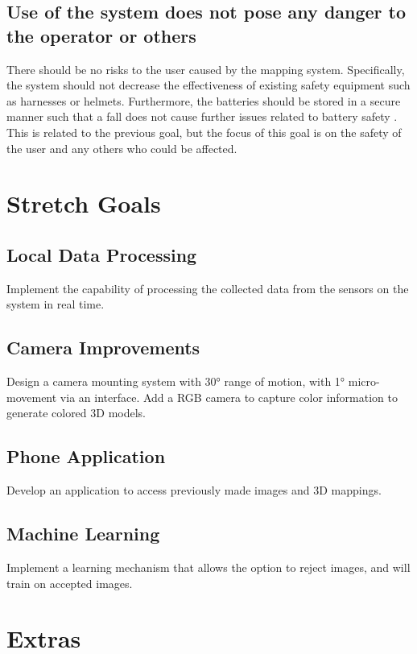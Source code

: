 \documentclass{article}
\begin{document}
\subsection{Use of the system does not pose any danger to the operator or others}

There should be no risks to the user caused by the mapping system. Specifically, the system
should not decrease the effectiveness of existing safety equipment such as harnesses or helmets.
Furthermore, the batteries should be stored in a secure manner such that a fall does not cause
further issues related to battery safety . This is related to the previous goal, but the focus of this goal is on the safety of the user and any others who could be affected.

\section{Stretch Goals}

\subsection{Local Data Processing}
Implement the capability of processing the collected data from the sensors on the system in real time.

\subsection{Camera Improvements}
Design a camera mounting system with 30° range of motion, with 1° micro-movement via an interface. Add a RGB camera to capture color information to generate colored 3D models.

\subsection{Phone Application}
Develop an application to access previously made images and 3D mappings.

\subsection{Machine Learning}
Implement a learning mechanism that allows the option to reject images, and will train on accepted images.

\section{Extras}
\end{document}
